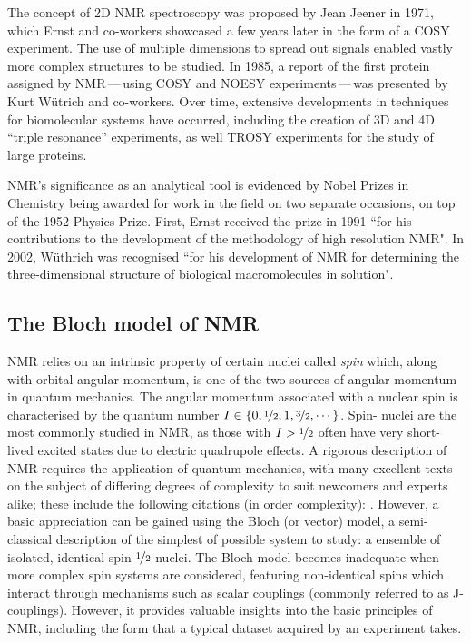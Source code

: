 The concept of \ac{2D} \ac{NMR} spectroscopy was proposed by Jean Jeener in
1971\cite{Jeener1971, Jeener2016}, which Ernst and co-workers showcased a few
years later in the form of a \ac{COSY} experiment\cite{Aue1976a}. The use of
multiple dimensions to spread out signals enabled vastly more complex
structures to be studied. In 1985, a report of the first protein assigned by
\ac{NMR}\,---\,using \ac{COSY} and \ac{NOESY} experiments\,---\,was presented
by Kurt W\"utrich and co-workers\cite{Williamson1985}. Over time, extensive
developments in techniques for biomolecular systems have occurred, including
the creation of 3D and 4D ``triple resonance'' experiments\cite{Marion1989,
Kay1990}, as well \ac{TROSY} experiments\cite{Pervushin1997} for the study of
large proteins.

\ac{NMR}'s significance as an analytical tool is evidenced by Nobel Prizes in
Chemistry being awarded for work in the field on two separate occasions, on top
of the 1952 Physics Prize. First,
Ernst received the prize in 1991 ``for his contributions to the development of
the methodology of high resolution \acl{NMR}"\cite{Ernst1992}. In 2002,
W\"uthrich was recognised ``for his development of \acl{NMR} for determining
the three-dimensional structure of biological macromolecules in
solution"\cite{Wuthrich2003}.

\subsection{The Bloch model of \acs{NMR}}

\ac{NMR} relies on an intrinsic property of certain nuclei called \textit{spin}
which, along with orbital angular momentum, is one of the two sources of
angular momentum in quantum mechanics.
The angular momentum associated with a nuclear spin is characterised by the
quantum number $I \in \lbrace 0, \nicefrac{1}{2}, 1, \nicefrac{3}{2}, \cdots
\rbrace$. Spin-
nuclei are the most commonly studied in \ac{NMR}, as those with $I >
\nicefrac{1}{2}$ often have very short-lived excited states due to electric
quadrupole effects. A rigorous description of \ac{NMR} requires the application
of quantum mechanics, with many excellent texts on the subject of differing
degrees of complexity to suit newcomers and experts alike; these include the
following citations (in order complexity):
\cite{Hore2015,Levitt2007,Cavanagh2007,Goldman1988,Abragam1961}.
However, a basic
appreciation can be gained using the Bloch (or vector) model, a semi-classical
description of the simplest of possible system to study: a ensemble of
isolated, identical spin-$\nicefrac{1}{2}$ nuclei\cite[Chapter 1]{Hore2015}.
The Bloch model becomes inadequate when more complex spin systems are
considered, featuring non-identical spins which interact through mechanisms
such as scalar couplings (commonly referred to as J-couplings). However,
it provides valuable insights into the basic principles of \ac{NMR},
including the form that a typical dataset acquired by an experiment takes.


